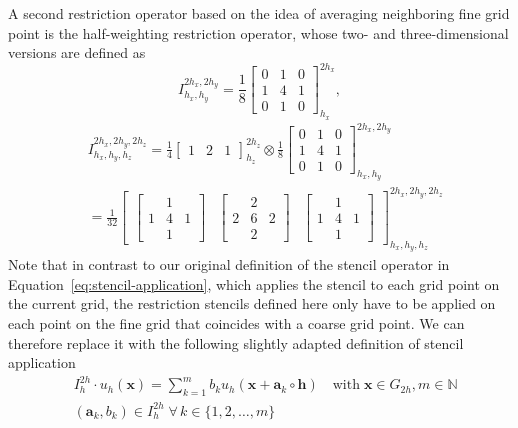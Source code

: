 A second restriction operator based on the idea of averaging neighboring fine grid point is the half-weighting restriction operator, whose two- and three-dimensional versions are defined as
\begin{equation}
	I^{2h_x,2h_y}_{h_x, h_y} = \frac{1}{8}
	\begin{bmatrix}
		0 & 1 & 0 \\
		1 & 4 & 1 \\
		0 & 1 & 0
	\end{bmatrix}^{2h_x}_{h_x},
\end{equation} 
\begin{equation}
\begin{split}
	& I^{2h_x, 2h_y, 2h_z}_{h_x, h_y, h_z} = 
\frac{1}{4} \begin{bmatrix}
	1 & 2 & 1
\end{bmatrix}_{h_z}^{2h_z}
\otimes 
\frac{1}{8}
	\begin{bmatrix}
	0 & 1 & 0 \\
	1 & 4 & 1 \\
	0 & 1 & 0 
\end{bmatrix}^{2h_x,2h_y}_{h_x, h_y} \\
& =
\frac{1}{32} \begin{bmatrix}
	\begin{bmatrix}
		& 1 &  \\
		1 & 4 & 1 \\
		& 1 & 
	\end{bmatrix}
 &		\begin{bmatrix}
 	& 2 &  \\
 	2 & 6 & 2 \\
 	& 2 & 
 \end{bmatrix} &
	\begin{bmatrix}
	& 1 &  \\
	1 & 4 & 1 \\
	& 1 & 
\end{bmatrix}
\end{bmatrix}^{2h_x, 2h_y, 2h_z}_{h_x, h_y, h_z}
\end{split}
\end{equation} 
Note that in contrast to our original definition of the stencil operator in Equation~\eqref{eq:stencil-application}, which applies the stencil to each grid point on the current grid, the restriction stencils defined here only have to be applied on each point on the fine grid that coincides with a coarse grid point.
We can therefore replace it with the following slightly adapted definition of stencil application
\begin{equation}
	\begin{split}
		& I_{h}^{2h} \cdot u_h(\bm{x}) = \sum_{k=1}^m b_k u_h({\bm x + \bm{a}_k} \circ \bm{h}) \quad 
		\text{with} \; \bm{x} \in G_{2h}, m \in \mathbb{N} \\ & (\bm{a}_k, b_k) \in I_{h}^{2h} \; \forall \, k \in \{ 1, 2, \dots, m \}
	\end{split}
	\label{eq:stencil-restriction-application}
\end{equation}
